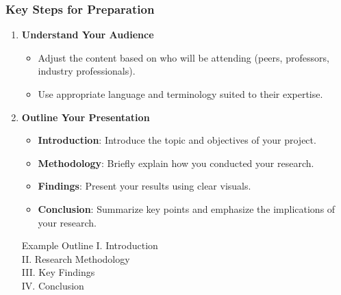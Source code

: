 \documentclass[aspectratio=169]{beamer}
\begin{document}
\begin{frame}[fragile]
    \frametitle{Key Steps for Preparation}
    \begin{enumerate}
        \item \textbf{Understand Your Audience}
        \begin{itemize}
            \item Adjust the content based on who will be attending (peers, professors, industry professionals).
            \item Use appropriate language and terminology suited to their expertise.
        \end{itemize}

        \item \textbf{Outline Your Presentation}
        \begin{itemize}
            \item \textbf{Introduction}: Introduce the topic and objectives of your project.
            \item \textbf{Methodology}: Briefly explain how you conducted your research.
            \item \textbf{Findings}: Present your results using clear visuals.
            \item \textbf{Conclusion}: Summarize key points and emphasize the implications of your research.
        \end{itemize}
        
        \begin{block}{Example Outline}
            I. Introduction \\
            II. Research Methodology \\
            III. Key Findings \\
            IV. Conclusion
        \end{block}
    \end{enumerate}
\end{frame}
\end{document}
